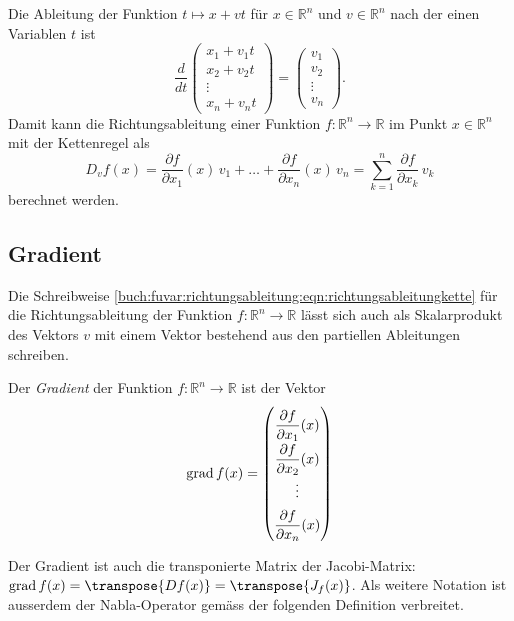 Die Ableitung der Funktion $t\mapsto x+vt$ für $x\in\mathbb{R}^n$
und $v\in\mathbb{R}^n$ nach der einen Variablen $t$ ist
\[
\frac{d}{dt}
\begin{pmatrix}
x_1+v_1t\\
x_2+v_2t\\
\vdots  \\
x_n+v_nt
\end{pmatrix}
=
\begin{pmatrix}
v_1\\
v_2\\
\vdots\\
v_n
\end{pmatrix}.
\]
Damit kann die Richtungsableitung einer Funktion
$f\colon\mathbb{R}^n\to\mathbb{R}$
im Punkt $x\in\mathbb{R}^n$ mit der Kettenregel als
\begin{equation}
D_vf(x)
=
\frac{\partial f}{\partial x_1}(x)\, v_1
+
\dots
+
\frac{\partial f}{\partial x_n}(x)\, v_n
=
\sum_{k=1}^n \frac{\partial f}{\partial x_k}\, v_k
\label{buch:fuvar:richtungsableitung:eqn:richtungsableitungkette}
\end{equation}
berechnet werden.

%
%
\subsection{Gradient}
Die Schreibweise
\eqref{buch:fuvar:richtungsableitung:eqn:richtungsableitungkette}
für die Richtungsableitung der Funktion $f\colon\mathbb{R}^n\to\mathbb{R}$
lässt sich auch als Skalarprodukt des Vektors $v$ mit einem Vektor
bestehend aus den partiellen Ableitungen schreiben.

\begin{definition}
\label{buch:fuvar:richtungsableitung:def:gradient}
Der {\em Gradient} der Funktion $f\colon\mathbb{R}^n\to\mathbb{R}$ ist der
Vektor
\[
\operatorname{grad}f(x)
=
{
\renewcommand{\arraystretch}{1.9}
\begin{pmatrix}
\displaystyle
\frac{\partial f}{\partial x_1}(x)\\
\displaystyle
\frac{\partial f}{\partial x_2}(x)\\
\vdots \\
\displaystyle
\frac{\partial f}{\partial x_n}(x)
\end{pmatrix}
}
\]
\end{definition}

Der Gradient ist auch die transponierte Matrix der Jacobi-Matrix:
$\operatorname{grad}f(x) = \transpose{Df(x)} = \transpose{J_f(x)}$.
Als weitere Notation ist ausserdem der Nabla-Operator gemäss der folgenden
Definition verbreitet.

